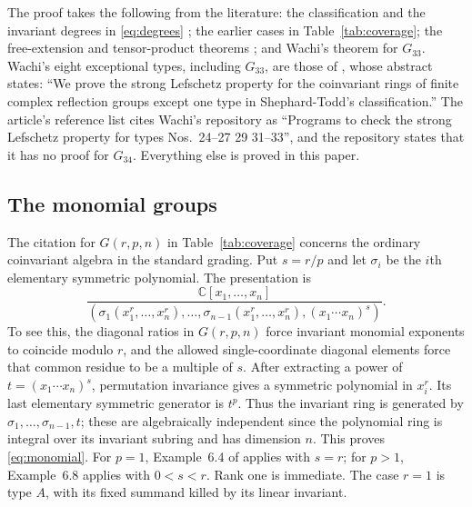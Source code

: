 \documentclass[11pt]{article}
\theoremstyle{definition}
\newcommand{\C}{\mathbb C}
\begin{document}
The proof takes the following from the literature: the classification
and the invariant degrees in \eqref{eq:degrees} \cite{ST,WachiLecture,OS};
the earlier cases in Table~\ref{tab:coverage}; the free-extension and
tensor-product theorems \cite{HW03,HW07,MCCM}; and Wachi's theorem for
$G_{33}$. Wachi's eight exceptional types, including $G_{33}$, are those
of \cite{Wachi25}, whose abstract states: ``We prove the strong Lefschetz
property for the coinvariant rings of finite complex reflection groups
except one type in Shephard-Todd's classification.'' The article's
reference list cites Wachi's repository \cite{WachiCode} as ``Programs to
check the strong Lefschetz property for types Nos.\ 24--27 29 31--33'',
and the repository states that it has no proof for $G_{34}$. Everything
else is proved in this paper.

\begin{appendices}
\section{The monomial groups}\label{app:monomial}
The citation for $G(r,p,n)$ in Table~\ref{tab:coverage} concerns the ordinary
coinvariant algebra in the standard grading. Put $s=r/p$ and let $\sigma_i$
be the $i$th elementary symmetric polynomial. The presentation is
\begin{equation}\label{eq:monomial}
 \frac{\C[x_1,\ldots,x_n]}
 {(\sigma_1(x_1^r,\ldots,x_n^r),\ldots,
    \sigma_{n-1}(x_1^r,\ldots,x_n^r),(x_1\cdots x_n)^s)}.
\end{equation}
To see this, the diagonal ratios in $G(r,p,n)$ force invariant monomial
exponents to coincide modulo $r$, and the allowed single-coordinate
diagonal elements force that common residue to be a multiple of $s$.
After extracting a power of $t=(x_1\cdots x_n)^s$, permutation
invariance gives a symmetric polynomial in $x_i^r$. Its last elementary
symmetric generator is $t^p$. Thus the invariant ring is generated by
$\sigma_1,\ldots,\sigma_{n-1},t$; these are algebraically independent since
the polynomial ring is integral over its invariant subring and has
dimension $n$. This proves \eqref{eq:monomial}. For $p=1$, Example~6.4
of \cite{HW06} applies with $s=r$; for $p>1$, Example~6.8 applies with
$0<s<r$. Rank one is immediate. The case $r=1$ is type $A$, with its
fixed summand killed by its linear invariant.


\end{appendices}
\end{document}

